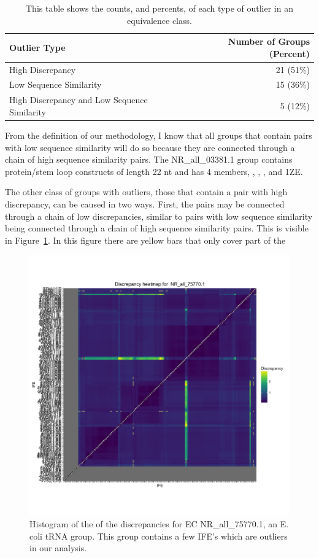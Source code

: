 \begin{table}
  \begin{tabular}{lr}
    \toprule
    Outlier Type & Number of Groups (Percent) \\
    \midrule
    High Discrepancy & 21 (51\%) \\
    Low Sequence Similarity & 15 (36\%) \\
    High Discrepancy and Low Sequence Similarity & 5 (12\%) \\
    \bottomrule
  \end{tabular}
  \caption{This table shows the counts, and percents, of each type of outlier
  in an equivalence class.}
  \label{tab:outlier-types}
\end{table}

From the definition of our methodology, I know that all groups that contain
pairs with low sequence similarity will do so because they are connected through
a chain of high sequence similarity pairs. The NR\_all\_03381.1 group contains
protein/stem loop constructs of length 22 nt and has 4 members,
, ,  , and 1ZE.

The other class of groups with outliers, those that contain a pair with high
discrepancy, can be caused in two ways. First, the pairs may be connected
through a chain of low discrepancies, similar to pairs with low sequence
similarity being connected through a chain of high sequence similarity pairs.
This is visible in Figure~\ref{fig:nr-all-75770.1-disc}. In this figure there are
yellow bars that only cover part of the

\begin{figure}[h]
  \includegraphics[width=\linewidth]{chapter-3/figs/nr-all-75770-1-disc}
  \caption{Histogram of the of the discrepancies for EC NR\_all\_75770.1, an E.
    coli tRNA group. This group contains a few IFE's which are outliers in our
  analysis.}
  \label{fig:nr-all-75770.1-disc}
\end{figure}

